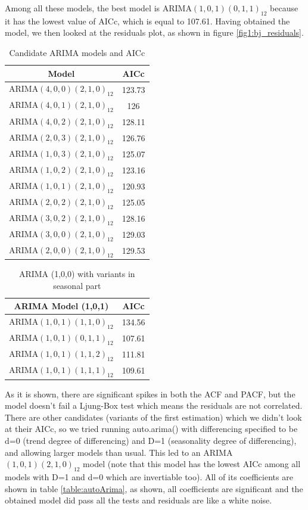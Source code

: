 \documentclass[journal, a4paper]{IEEEtran}
\begin{document}
Among all these models, the best model is ARIMA$(1,0,1)(0,1,1)_{12}$ because it has the lowest value of AICc, which is equal to 107.61. Having obtained the model, we then looked at the residuals plot, as shown in figure \ref{fig1:bj_residuals}.

\begin{table}[H]
\caption{Candidate ARIMA models and AICc}
\label{table:candidate}
\centering
\begin{tabular}{|c|c|}
\hline
Model & AICc \\ \hline
ARIMA$(4,0,0)(2,1,0)_{12}$ & 123.73  \\ 
ARIMA$(4,0,1)(2,1,0)_{12}$ &  126 \\
ARIMA$(4,0,2)(2,1,0)_{12}$ &   128.11  \\
ARIMA$(2,0,3)(2,1,0)_{12}$ & 126.76\\ 
ARIMA$(1,0,3)(2,1,0)_{12}$  & 125.07  \\ 
ARIMA$(1,0,2)(2,1,0)_{12}$ & 123.16\\ 
ARIMA$(1,0,1)(2,1,0)_{12}$ & 120.93   \\ 
ARIMA$(2,0,2)(2,1,0)_{12}$ &125.05 \\
ARIMA$(3,0,2)(2,1,0)_{12}$  & 128.16  \\ 
ARIMA$(3,0,0)(2,1,0)_{12}$ &129.03 \\
ARIMA$(2,0,0)(2,1,0)_{12}$   & 129.53  \\  
\hline
\end{tabular}
\end{table}





\begin{table}[H]
\caption{ARIMA (1,0,0) with variants in seasonal part}
\label{table:seasonal}
\centering
\begin{tabular}{|c|c|}
\hline
ARIMA Model (1,0,1) & AICc \\ \hline
ARIMA$(1,0,1)(1,1,0)_{12}$ & 134.56  \\ 
ARIMA$(1,0,1)(0,1,1)_{12}$ &  107.61  \\ 
ARIMA$(1,0,1)(1,1,2)_{12}$ & 111.81  \\ 
ARIMA$(1,0,1)(1,1,1)_{12}$ & 109.61  \\
\hline
\end{tabular}
\end{table}
As it is shown, there are significant spikes in both the ACF and PACF, but the model doesn't fail a Ljung-Box test which means the residuals are not correlated. 
There are other candidates (variants of the first estimation) which we didn't look at their AICc, so we tried running auto.arima() with differencing specified to be d=0 (trend degree of differencing) and D=1 (seasonality degree of differencing), and allowing larger models than usual. This led to an ARIMA$(1,0,1)(2,1,0)_{12}$ model (note that this model has the lowest AICc among all models with D=1 and d=0 which are invertiable too). All of its coefficients are shown in table \ref{table:autoArima}, as shown, all coefficients are significant and the obtained model did pass all the tests and residuals are like a white noise. 
\end{document}
